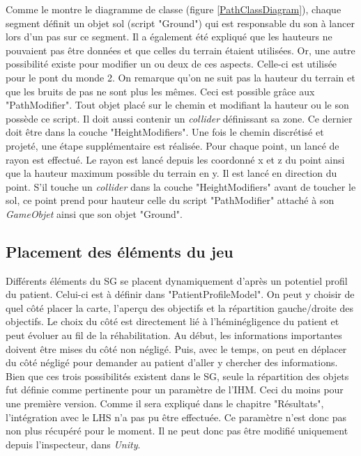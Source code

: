		Comme le montre le diagramme de classe (figure \ref{PathClassDiagram}), chaque segment définit un objet sol (script "Ground") qui est responsable du son à lancer lors d'un pas sur ce segment. Il a également été expliqué que les hauteurs ne pouvaient pas être données et que celles du terrain étaient utilisées. Or, une autre possibilité existe pour modifier un ou deux de ces aspects. Celle-ci est utilisée pour le pont du monde 2. On remarque qu'on ne suit pas la hauteur du terrain et que les bruits de pas ne sont plus les mêmes. Ceci est possible grâce aux "PathModifier". Tout objet placé sur le chemin et modifiant la hauteur ou le son possède ce script. Il doit aussi contenir un \textit{collider} définissant sa zone. Ce dernier doit être dans la couche "HeightModifiers".
		Une fois le chemin discrétisé et projeté, une étape supplémentaire est réalisée. Pour chaque point, un lancé de rayon est effectué. Le rayon est lancé depuis les coordonné x et z du point ainsi que la hauteur maximum possible du terrain en y. Il est lancé en direction du point. S'il touche un \textit{collider} dans la couche "HeightModifiers" avant de toucher le sol, ce point prend pour hauteur celle du script "PathModifier" attaché à son \textit{GameObjet} ainsi que son objet "Ground".
		
	
	\subsection*{Placement des éléments du jeu}
		Différents éléments du SG se placent dynamiquement d'après un potentiel profil du patient. Celui-ci est à définir dans "PatientProfileModel". On peut y choisir de quel côté placer la carte, l'aperçu des objectifs et la répartition gauche/droite des objectifs. Le choix du côté est directement lié à l'héminégligence du patient et peut évoluer au fil de la réhabilitation. Au début, les informations importantes doivent être mises du côté non négligé. Puis, avec le temps, on peut en déplacer du côté négligé pour demander au patient d'aller y chercher des informations.
		Bien que ces trois possibilités existent dans le SG, seule la répartition des objets fut définie comme pertinente pour un paramètre de l'IHM. Ceci du moins pour une première version. Comme il sera expliqué dans le chapitre "Résultats", l'intégration avec le LHS n'a pas pu être effectuée. Ce paramètre n'est donc pas non plus récupéré pour le moment. Il ne peut donc pas être modifié uniquement depuis l'inspecteur, dans \textit{Unity}.
		\\
	
